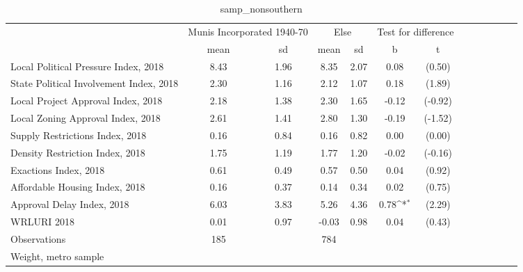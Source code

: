 \begin{table}[htbp]\centering
\def\sym#1{\ifmmode^{#1}\else\(^{#1}\)\fi}
\caption{samp\_nonsouthern \label{tab1}}
\begin{tabular}{l*{3}{cccc}}
\toprule
                    &\multicolumn{2}{c}{Munis Incorporated 1940-70}&\multicolumn{2}{c}{Else} &\multicolumn{2}{c}{Test for difference}\\
                    &        mean&          sd&        mean&          sd&           b         &           t\\
\midrule
Local Political Pressure Index, 2018&        8.43&        1.96&        8.35&        2.07&        0.08         &      (0.50)\\
State Political Involvement Index, 2018&        2.30&        1.16&        2.12&        1.07&        0.18         &      (1.89)\\
Local Project Approval Index, 2018&        2.18&        1.38&        2.30&        1.65&       -0.12         &     (-0.92)\\
Local Zoning Approval Index, 2018&        2.61&        1.41&        2.80&        1.30&       -0.19         &     (-1.52)\\
Supply Restrictions Index, 2018&        0.16&        0.84&        0.16&        0.82&        0.00         &      (0.00)\\
Density Restriction Index, 2018&        1.75&        1.19&        1.77&        1.20&       -0.02         &     (-0.16)\\
Exactions Index, 2018&        0.61&        0.49&        0.57&        0.50&        0.04         &      (0.92)\\
Affordable Housing Index, 2018&        0.16&        0.37&        0.14&        0.34&        0.02         &      (0.75)\\
Approval Delay Index, 2018&        6.03&        3.83&        5.26&        4.36&        0.78\sym{*}  &      (2.29)\\
WRLURI 2018         &        0.01&        0.97&       -0.03&        0.98&        0.04         &      (0.43)\\
\midrule
Observations        &         185&            &         784&            &                     &            \\
\bottomrule
\multicolumn{7}{l}{\footnotesize Weight, metro sample}\\
\end{tabular}
\end{table}
